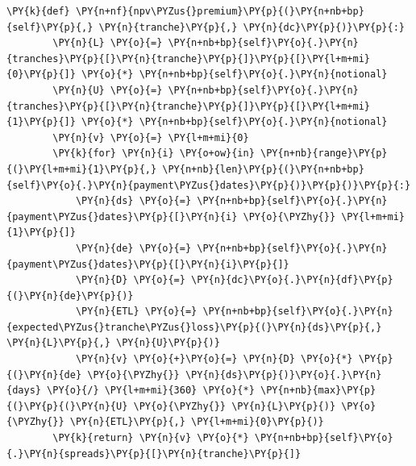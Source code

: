\begin{codebox}
\begin{Verbatim}[commandchars=\\\{\}]
    \PY{k}{def} \PY{n+nf}{npv\PYZus{}premium}\PY{p}{(}\PY{n+nb+bp}{self}\PY{p}{,} \PY{n}{tranche}\PY{p}{,} \PY{n}{dc}\PY{p}{)}\PY{p}{:}
        \PY{n}{L} \PY{o}{=} \PY{n+nb+bp}{self}\PY{o}{.}\PY{n}{tranches}\PY{p}{[}\PY{n}{tranche}\PY{p}{]}\PY{p}{[}\PY{l+m+mi}{0}\PY{p}{]} \PY{o}{*} \PY{n+nb+bp}{self}\PY{o}{.}\PY{n}{notional}
        \PY{n}{U} \PY{o}{=} \PY{n+nb+bp}{self}\PY{o}{.}\PY{n}{tranches}\PY{p}{[}\PY{n}{tranche}\PY{p}{]}\PY{p}{[}\PY{l+m+mi}{1}\PY{p}{]} \PY{o}{*} \PY{n+nb+bp}{self}\PY{o}{.}\PY{n}{notional}
        \PY{n}{v} \PY{o}{=} \PY{l+m+mi}{0}
        \PY{k}{for} \PY{n}{i} \PY{o+ow}{in} \PY{n+nb}{range}\PY{p}{(}\PY{l+m+mi}{1}\PY{p}{,} \PY{n+nb}{len}\PY{p}{(}\PY{n+nb+bp}{self}\PY{o}{.}\PY{n}{payment\PYZus{}dates}\PY{p}{)}\PY{p}{)}\PY{p}{:}
            \PY{n}{ds} \PY{o}{=} \PY{n+nb+bp}{self}\PY{o}{.}\PY{n}{payment\PYZus{}dates}\PY{p}{[}\PY{n}{i} \PY{o}{\PYZhy{}} \PY{l+m+mi}{1}\PY{p}{]}
            \PY{n}{de} \PY{o}{=} \PY{n+nb+bp}{self}\PY{o}{.}\PY{n}{payment\PYZus{}dates}\PY{p}{[}\PY{n}{i}\PY{p}{]}
            \PY{n}{D} \PY{o}{=} \PY{n}{dc}\PY{o}{.}\PY{n}{df}\PY{p}{(}\PY{n}{de}\PY{p}{)}
            \PY{n}{ETL} \PY{o}{=} \PY{n+nb+bp}{self}\PY{o}{.}\PY{n}{expected\PYZus{}tranche\PYZus{}loss}\PY{p}{(}\PY{n}{ds}\PY{p}{,} \PY{n}{L}\PY{p}{,} \PY{n}{U}\PY{p}{)}
            \PY{n}{v} \PY{o}{+}\PY{o}{=} \PY{n}{D} \PY{o}{*} \PY{p}{(}\PY{n}{de} \PY{o}{\PYZhy{}} \PY{n}{ds}\PY{p}{)}\PY{o}{.}\PY{n}{days} \PY{o}{/} \PY{l+m+mi}{360} \PY{o}{*} \PY{n+nb}{max}\PY{p}{(}\PY{p}{(}\PY{n}{U} \PY{o}{\PYZhy{}} \PY{n}{L}\PY{p}{)} \PY{o}{\PYZhy{}} \PY{n}{ETL}\PY{p}{,} \PY{l+m+mi}{0}\PY{p}{)}
        \PY{k}{return} \PY{n}{v} \PY{o}{*} \PY{n+nb+bp}{self}\PY{o}{.}\PY{n}{spreads}\PY{p}{[}\PY{n}{tranche}\PY{p}{]}
	

\end{Verbatim}
\end{codebox}

